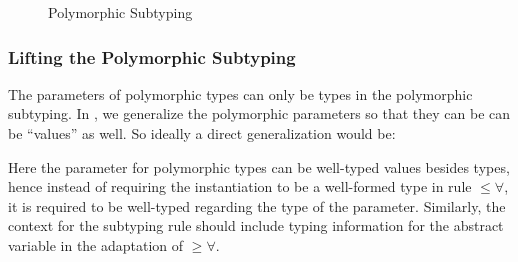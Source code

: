 \begin{figure}
\label{fig:polymorphic-subtyping}
\centering


\caption{Polymorphic Subtyping}
\end{figure}


\subsubsection{Lifting the Polymorphic Subtyping}
\label{sec:polymorphic-subtyping}

The parameters of polymorphic types can only be types in the polymorphic
subtyping. In \name, we generalize the polymorphic parameters so that they can
be can be ``values'' as well. So ideally a direct generalization would be:


Here the parameter for polymorphic types can be well-typed values besides types,
hence instead of requiring the instantiation to be a well-formed type in rule
$\le\forall$, it is required to be well-typed regarding the type of the parameter.
Similarly, the context for the subtyping rule should include typing information
for the abstract variable in the adaptation of $\ge\forall$.

